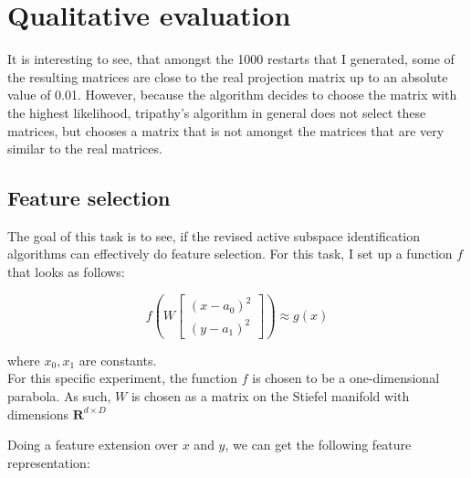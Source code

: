 \section{Qualitative evaluation}
It is interesting to see, that amongst the 1000 restarts that I generated, some of the resulting matrices are close to the real projection matrix up to an absolute value of 0.01.
However, because the algorithm decides to choose the matrix with the highest likelihood, tripathy's algorithm in general does not select these matrices, but chooses a matrix that is not amongst the matrices that are very similar to the real matrices.

\subsection{Feature selection}
The goal of this task is to see, if the revised active subspace identification algorithms can effectively do feature selection.
For this task, I set up a function $ f $ that looks as follows:

\def\B{
\begin{bmatrix}
    (x - a_0)^2 \\
    (y - a_1)^2
\end{bmatrix}}

\begin{equation} \label{eq:FeatureExtension}
f \left( W \B \right) \approx g \left( x \right)
\end{equation} 

where $x_0, x_1$ are constants. \\

For this specific experiment, the function $f$ is chosen to be a one-dimensional parabola. 
As such, $W$ is chosen as a matrix on the Stiefel manifold with dimensions $\mathbf{R}^{d \times D}$

Doing a feature extension over $x$ and $y$, we can get the following feature representation:

\def\PHI{
\begin{bmatrix}
	x_0^2 \\
	x_1^2 \\
	x_0 \\
	x_1 \\
    1
\end{bmatrix}}


\def\WtoPhi{
\begin{bmatrix}
	w_0 \\
    w_1 \\
	-2 w_0 a_0 \\
	-2 w_1 a_1 \\
	w_0 a_0^2 + w_1 a_1^2
\end{bmatrix}}

